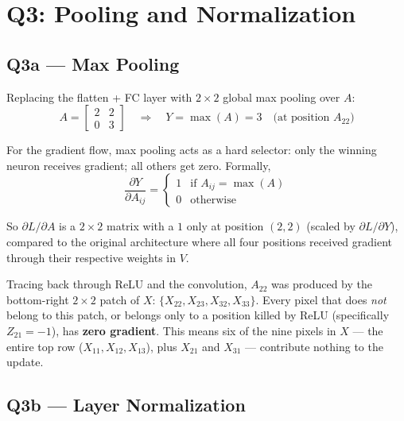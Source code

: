 \documentclass[11pt,a4paper]{article}
\begin{document}
\section{Q3: Pooling and Normalization}

\subsection{Q3a --- Max Pooling}

Replacing the flatten + FC layer with $2\times2$ global max pooling over $A$:
\[
A = \begin{bmatrix}2 & 2 \\ 0 & 3\end{bmatrix}
\quad \Rightarrow \quad
Y = \max(A) = 3 \quad \text{(at position } A_{22}\text{)}
\]

For the gradient flow, max pooling acts as a hard selector: only the winning
neuron receives gradient; all others get zero. Formally,
\[
\frac{\partial Y}{\partial A_{ij}} =
\begin{cases} 1 & \text{if } A_{ij} = \max(A) \\ 0 & \text{otherwise} \end{cases}
\]

So $\partial L / \partial A$ is a $2\times2$ matrix with a $1$ only at position
$(2,2)$ (scaled by $\partial L/\partial Y$), compared to the original
architecture where all four positions received gradient through their respective
weights in $V$.

Tracing back through ReLU and the convolution, $A_{22}$ was produced by the
bottom-right $2\times2$ patch of $X$: $\{X_{22}, X_{23}, X_{32}, X_{33}\}$.
Every pixel that does \emph{not} belong to this patch, or belongs only to a
position killed by ReLU (specifically $Z_{21}=-1$), has \textbf{zero gradient}.
This means six of the nine pixels in $X$ --- the entire top row
($X_{11}, X_{12}, X_{13}$), plus $X_{21}$ and $X_{31}$ --- contribute nothing
to the update.

\subsection{Q3b --- Layer Normalization}
\end{document}

